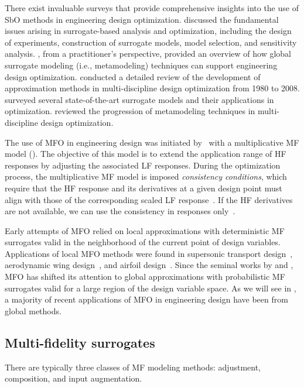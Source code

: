 \documentclass[journal ]{new-aiaa}
\begin{document}
There exist invaluable surveys that provide comprehensive insights into the use of SbO methods in engineering design optimization.
\citet{Queipo2005} discussed the fundamental issues arising in surrogate-based analysis and optimization, including the design of experiments, construction of surrogate models, model selection, and sensitivity analysis.
\citet{Wang2006}, from a practitioner’s perspective, provided an overview of how global surrogate modeling (i.e., metamodeling) techniques can support engineering design optimization. 
\citet{Simpson2008} conducted a detailed review of the development of approximation methods in multi-discipline design optimization from 1980 to 2008.
\citet{Forrester2009} surveyed several state-of-the-art surrogate models and their applications in optimization.
\citet{Viana2014} reviewed the progression of metamodeling techniques in multi-discipline design optimization.

The use of MFO in engineering design was initiated by~\citet{Haftka1991} with a multiplicative MF model ().
The objective of this model is to extend the application range of HF responses by adjusting the associated LF responses.
During the optimization process, the multiplicative MF model is imposed \textit{consistency conditions}, which require that the HF response and its derivatives at a given design point must align with those of the corresponding scaled LF response~\citep{Alexandrov2001}.
If the HF derivatives are not available, we can use the consistency in responses only~\citep{Rodriguez2001}.

Early attempts of MFO relied on local approximations with deterministic MF surrogates valid in the neighborhood of the current point of design variables.
Applications of local MFO methods were found in supersonic transport design~\citep{Knill1999}, aerodynamic wing design~\citep{Alexandrov2001}, and airfoil design~\citep{Gano2005}.
Since the seminal works by \citet{Huang2006smo} and \citet{Forrester2007}, MFO has shifted its attention to global approximations with probabilistic MF surrogates valid for a large region of the design variable space.
As we will see in , a majority of recent applications of MFO in engineering design have been from global methods.

\subsection{Multi-fidelity surrogates}\label{Sec22}

There are typically three classes of MF modeling methods:
adjustment, composition, and input augmentation.
\end{document}
